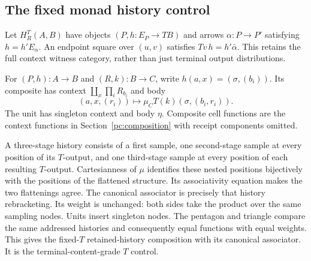 \documentclass[11pt,a4paper]{article}
\theoremstyle{definition}
\begin{document}
\subsection{The fixed monad history control}\label{pc:fixed-T}

Let $H^T_R(A,B)$ have objects $(P,h:E_P\to TB)$ and arrows
$\alpha:P\to P'$ satisfying $h=h'E_\alpha$. An endpoint square over
$(u,v)$ satisfies $Tv\,h=h'\bar\alpha$. This retains the full context
witness category, rather than just terminal output distributions.

For $(P,h):A\to B$ and $(R,k):B\to C$, write
$h(a,x)=(\sigma,(b_i))$. Its composite has context
$\coprod_x\prod_iR_{b_i}$ and body
\begin{equation}\label{pc:fixed-composition}
 (a,x,(r_i))\longmapsto\mu_C T(k)(\sigma,(b_i,r_i)).
\end{equation}
The unit has singleton context and body $\eta$. Composite cell functions
are the context functions in Section~\ref{pc:composition} with receipt
components omitted.

A three-stage history consists of a first sample, one second-stage sample
at every position of its $T$-output, and one third-stage sample at every
position of each resulting $T$-output. Cartesianness of $\mu$ identifies
these nested positions bijectively with the positions of the flattened
structure. Its associativity equation makes the two flattenings agree.
The canonical associator is precisely that history rebracketing. Its weight
is unchanged: both sides take the product over the same sampling nodes.
Units insert singleton nodes. The pentagon and triangle compare the same
addressed histories and consequently equal functions with equal weights.
This gives the fixed-$T$ retained-history composition with its canonical
associator. It is the terminal-content-grade $T$ control.
\end{document}
